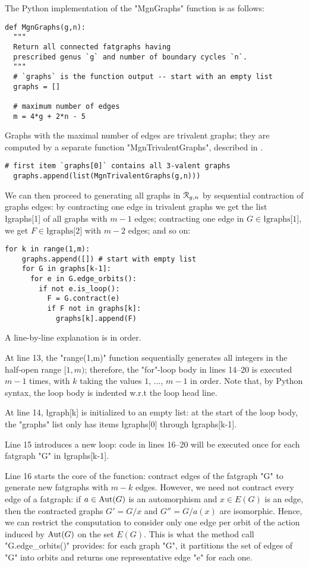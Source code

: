 The Python implementation of the "MgnGraphs" function is as follows:
\begin{lstlisting}[name=MgnGraphs,firstnumber=1]
def MgnGraphs(g,n):
  """
  Return all connected fatgraphs having
  prescribed genus `g` and number of boundary cycles `n`.
  """
  # `graphs` is the function output -- start with an empty list
  graphs = []

  # maximum number of edges
  m = 4*g + 2*n - 5
\end{lstlisting}
Graphs with the maximal number of edges are trivalent graphs; they are
computed by a separate function "MgnTrivalentGraphs", described in
.
\begin{lstlisting}[name=MgnGraphs,firstnumber=11]
  # first item `graphs[0]` contains all 3-valent graphs
  graphs.append(list(MgnTrivalentGraphs(g,n)))
\end{lstlisting}
We can then proceed to generating all graphs in $\mathcal{R}_{g,n}$ by
sequential contraction of graphs edges: by contracting one edge in
trivalent graphs we get the list \l{graphs[1]} of all graphs with
$m-1$ edges; contracting one edge in $G \in \text{\l{graphs[1]}}$, we
get $F \in \text{\l{graphs[2]}}$ with $m-2$ edges; and so on:
\begin{lstlisting}[name=MgnGraphs,firstnumber=13]
  for k in range(1,m):
    graphs.append([]) # start with empty list
    for G in graphs[k-1]:
      for e in G.edge_orbits():
        if not e.is_loop():
          F = G.contract(e)
          if F not in graphs[k]:
            graphs[k].append(F)
\end{lstlisting}
A line-by-line explanation is in order.

At line 13, the "range(1,m)" function sequentially generates all
integers in the half-open range $[1, m)$; therefore, the "for"-loop
body in lines 14--20 is executed $m-1$ times, with $k$ taking the
values $1$, ..., $m-1$ in order.  Note that, by Python syntax, the
loop body is indented w.r.t the loop head line.

At line 14, \l{graph[k]} is initialized to an empty list: at the start
of the loop body, the "graphs" list only has items \l{graphs[0]}
through \l{graphs[k-1]}.

Line 15 introduces a new loop: code in lines 16--20 will be executed
once for each fatgraph "G" in \l{graphs[k-1]}.

Line 16 starts the core of the function: contract edges of the
fatgraph "G" to generate new fatgraphs with $m-k$ edges.  However,
we need not contract every edge of a fatgraph: if $a \in \operatorname{Aut}(G)$ is
an automorphism and $x \in E(G)$ is an edge, then the contracted
graphs $G' = G/x$ and $G'' = G/a(x)$ are isomorphic.  Hence, we can
restrict the computation to consider only one edge per orbit of the
action induced by $\operatorname{Aut}(G)$ on the set $E(G)$. This is what the method
call "G.edge_orbits()" provides: for each graph "G", it partitions
the set of edges of "G" into orbits and returns one representative
edge "e" for each one.

